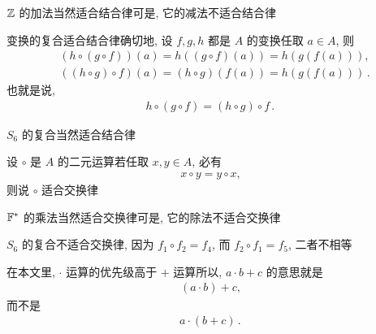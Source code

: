 \begin{example}
    $\mathbb{Z}$ 的加法当然适合结合律\period 可是, 它的减法不适合结合律\period
\end{example}

\begin{remark}
    变换的复合适合结合律\period 确切地, 设 $f,g,h$ 都是 $A$ 的变换\period 任取 $a \in A$, 则
    \begin{align*}
         & (h \circ (g \circ f))(a) = h((g \circ f)(a)) = h(g(f(a))),        \\
         & ((h \circ g) \circ f)(a) = (h \circ g)(f(a)) = h(g(f(a))) \period
    \end{align*}
    也就是说,
    \begin{align*}
        h \circ (g \circ f) = (h \circ g) \circ f \period
    \end{align*}
\end{remark}

\begin{example}
    $S_6$ 的复合当然适合结合律\period
\end{example}

\begin{definition}
    设 $\circ$ 是 $A$ 的二元运算\period 若任取 $x,y \in A$, 必有
    \begin{align*}
        x \circ y = y \circ x,
    \end{align*}
    则说 $\circ$ 适合交换律 \period
\end{definition}

\begin{example}
    $\mathbb{F}^{\ast}$ 的乘法当然适合交换律\period 可是, 它的除法不适合交换律\period
\end{example}

\begin{example}
    $S_6$ 的复合不适合交换律, 因为 $f_1 \circ f_2 = f_4$, 而 $f_2 \circ f_1 = f_5$, 二者不相等\period
\end{example}

\begin{remark}
    在本文里, $\cdot$ 运算的优先级高于 $+$ 运算\period 所以, $a \cdot b + c$ 的意思就是
    \begin{align*}
        (a \cdot b) + c,
    \end{align*}
    而不是
    \begin{align*}
        a \cdot (b + c)\period
    \end{align*}
\end{remark}

